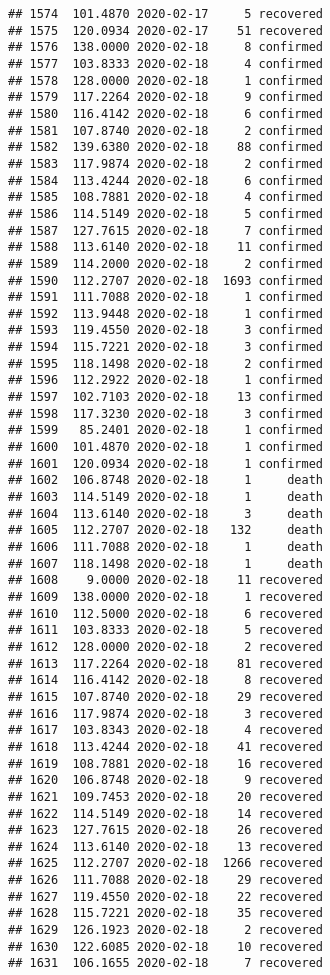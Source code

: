 \documentclass[
]{article}
\begin{document}
\begin{verbatim}
## 1574  101.4870 2020-02-17     5 recovered
## 1575  120.0934 2020-02-17    51 recovered
## 1576  138.0000 2020-02-18     8 confirmed
## 1577  103.8333 2020-02-18     4 confirmed
## 1578  128.0000 2020-02-18     1 confirmed
## 1579  117.2264 2020-02-18     9 confirmed
## 1580  116.4142 2020-02-18     6 confirmed
## 1581  107.8740 2020-02-18     2 confirmed
## 1582  139.6380 2020-02-18    88 confirmed
## 1583  117.9874 2020-02-18     2 confirmed
## 1584  113.4244 2020-02-18     6 confirmed
## 1585  108.7881 2020-02-18     4 confirmed
## 1586  114.5149 2020-02-18     5 confirmed
## 1587  127.7615 2020-02-18     7 confirmed
## 1588  113.6140 2020-02-18    11 confirmed
## 1589  114.2000 2020-02-18     2 confirmed
## 1590  112.2707 2020-02-18  1693 confirmed
## 1591  111.7088 2020-02-18     1 confirmed
## 1592  113.9448 2020-02-18     1 confirmed
## 1593  119.4550 2020-02-18     3 confirmed
## 1594  115.7221 2020-02-18     3 confirmed
## 1595  118.1498 2020-02-18     2 confirmed
## 1596  112.2922 2020-02-18     1 confirmed
## 1597  102.7103 2020-02-18    13 confirmed
## 1598  117.3230 2020-02-18     3 confirmed
## 1599   85.2401 2020-02-18     1 confirmed
## 1600  101.4870 2020-02-18     1 confirmed
## 1601  120.0934 2020-02-18     1 confirmed
## 1602  106.8748 2020-02-18     1     death
## 1603  114.5149 2020-02-18     1     death
## 1604  113.6140 2020-02-18     3     death
## 1605  112.2707 2020-02-18   132     death
## 1606  111.7088 2020-02-18     1     death
## 1607  118.1498 2020-02-18     1     death
## 1608    9.0000 2020-02-18    11 recovered
## 1609  138.0000 2020-02-18     1 recovered
## 1610  112.5000 2020-02-18     6 recovered
## 1611  103.8333 2020-02-18     5 recovered
## 1612  128.0000 2020-02-18     2 recovered
## 1613  117.2264 2020-02-18    81 recovered
## 1614  116.4142 2020-02-18     8 recovered
## 1615  107.8740 2020-02-18    29 recovered
## 1616  117.9874 2020-02-18     3 recovered
## 1617  103.8343 2020-02-18     4 recovered
## 1618  113.4244 2020-02-18    41 recovered
## 1619  108.7881 2020-02-18    16 recovered
## 1620  106.8748 2020-02-18     9 recovered
## 1621  109.7453 2020-02-18    20 recovered
## 1622  114.5149 2020-02-18    14 recovered
## 1623  127.7615 2020-02-18    26 recovered
## 1624  113.6140 2020-02-18    13 recovered
## 1625  112.2707 2020-02-18  1266 recovered
## 1626  111.7088 2020-02-18    29 recovered
## 1627  119.4550 2020-02-18    22 recovered
## 1628  115.7221 2020-02-18    35 recovered
## 1629  126.1923 2020-02-18     2 recovered
## 1630  122.6085 2020-02-18    10 recovered
## 1631  106.1655 2020-02-18     7 recovered

\end{verbatim}
\end{document}
